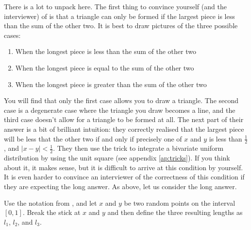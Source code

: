 \documentclass[a4paper]{article}
\begin{document}
There is a lot to unpack here.
The first thing to convince yourself (and the interviewer) of is that a triangle can only be formed if the largest piece is less than the sum of the other two.
It is best to draw pictures of the three possible cases:
\begin{enumerate}
  \item When the longest piece is less than the sum of the other two
  \item When the longest piece is equal to the sum of the other two
  \item When the longest piece is greater than the sum of the other two
\end{enumerate}
You will find that only the first case allows you to draw a triangle.
The second case is a degenerate case where the triangle you draw becomes a line, and the third case doesn't allow for a triangle to be formed at all.
The next part of their answer is a bit of brilliant intuition:
they correctly realised that the largest piece will be less that the other two if and only if precisely one of $x$ and $y$ is less than $\frac{1}{2}$, and $|x-y|<\frac{1}{2}$.
They then use the trick to integrate a bivariate uniform distribution by using the unit square (see appendix \ref{ap:tricks}).
If you think about it, it makes sense, but it is difficult to arrive at this condition by yourself.
It is even harder to convince an interviewer of the correctness of this condition if they are expecting the long answer.
As above, let us consider the long answer.

Use the notation from \citet{JoshiQA}, and let $x$ and $y$ be two random points on the interval $[0,1]$.
Break the stick at $x$ and $y$ and then define the three resulting lengths as
$l_1$,
$l_2$, and
$l_3$.
\end{document}
